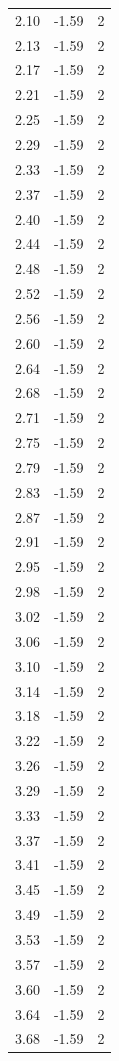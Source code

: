 \begin{longtable}{lrr}
  2.10 & -1.59 & 2 \\
  2.13 & -1.59 & 2 \\
  2.17 & -1.59 & 2 \\
  2.21 & -1.59 & 2 \\
  2.25 & -1.59 & 2 \\
  2.29 & -1.59 & 2 \\
  2.33 & -1.59 & 2 \\
  2.37 & -1.59 & 2 \\
  2.40 & -1.59 & 2 \\
  2.44 & -1.59 & 2 \\
  2.48 & -1.59 & 2 \\
  2.52 & -1.59 & 2 \\
  2.56 & -1.59 & 2 \\
  2.60 & -1.59 & 2 \\
  2.64 & -1.59 & 2 \\
  2.68 & -1.59 & 2 \\
  2.71 & -1.59 & 2 \\
  2.75 & -1.59 & 2 \\
  2.79 & -1.59 & 2 \\
  2.83 & -1.59 & 2 \\
  2.87 & -1.59 & 2 \\
  2.91 & -1.59 & 2 \\
  2.95 & -1.59 & 2 \\
  2.98 & -1.59 & 2 \\
  3.02 & -1.59 & 2 \\
  3.06 & -1.59 & 2 \\
  3.10 & -1.59 & 2 \\
  3.14 & -1.59 & 2 \\
  3.18 & -1.59 & 2 \\
  3.22 & -1.59 & 2 \\
  3.26 & -1.59 & 2 \\
  3.29 & -1.59 & 2 \\
  3.33 & -1.59 & 2 \\
  3.37 & -1.59 & 2 \\
  3.41 & -1.59 & 2 \\
  3.45 & -1.59 & 2 \\
  3.49 & -1.59 & 2 \\
  3.53 & -1.59 & 2 \\
  3.57 & -1.59 & 2 \\
  3.60 & -1.59 & 2 \\
  3.64 & -1.59 & 2 \\
  3.68 & -1.59 & 2 \\

\end{longtable}
